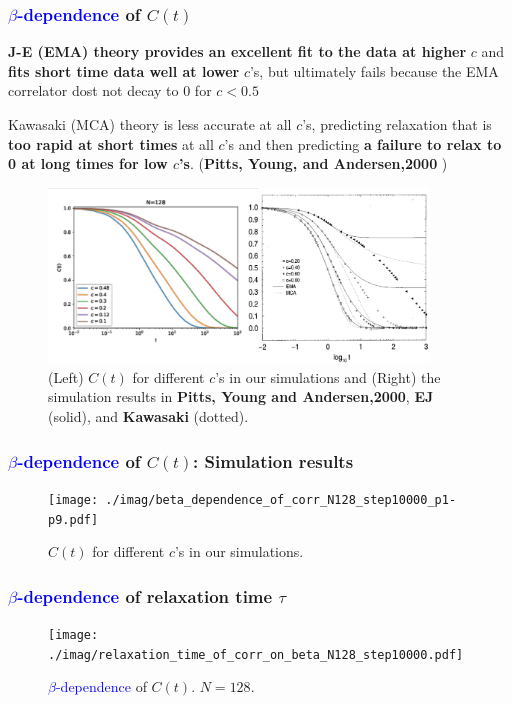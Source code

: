 \documentclass[8pt]{beamer}
\begin{document}
\begin{frame}
	\frametitle{{\textcolor{blue}{$\beta$-dependence}} of $C(t)$}
	\textbf{J-E (EMA) theory provides an excellent fit to the data at higher} $c$ and \textbf{fits short time data well at lower} $c$'s, but ultimately fails because the EMA correlator dost not decay to 0 for $c<0.5$
	
	Kawasaki (MCA) theory is less accurate at all $c$'s, predicting relaxation that is \textbf{too rapid at short times} at all $c$'s and then predicting \textbf{a failure to relax to 0 at long times for low $c$'s}. (\textbf{Pitts, Young, and Andersen,2000} )     
	\begin{figure}
		\centering
		\includegraphics [width=0.9\textwidth] {./imag/beta_dependence_of_corr_N128_step10000_b.pdf}
		\setlength{\abovecaptionskip}{0pt}
		\caption{ (Left) $C(t)$ for different $c$'s in our simulations and (Right) the simulation results in \textbf{Pitts, Young and Andersen,2000}, \textbf{EJ} (solid), and \textbf{Kawasaki} (dotted). }
	\end{figure}
\end{frame}
\begin{frame}
	\frametitle{{\textcolor{blue}{$\beta$-dependence}} of $C(t)$: Simulation results}    
	\begin{figure}
		\centering
		\texttt{[image: ./imag/beta\_dependence\_of\_corr\_N128\_step10000\_p1-p9.pdf]}
		\setlength{\abovecaptionskip}{0pt}
		\caption{ $C(t)$ for different $c$'s in our simulations.}
	\end{figure}
\end{frame}




\begin{frame}
	\frametitle{{\textcolor{blue}{$\beta$-dependence}} of relaxation time $\tau$}
	\begin{figure}
		\centering
		\texttt{[image: ./imag/relaxation\_time\_of\_corr\_on\_beta\_N128\_step10000.pdf]}
		\setlength{\abovecaptionskip}{0pt}
		\caption{{\textcolor{blue}{$\beta$-dependence}} of $C(t)$. $N=128$.}
	\end{figure}
\end{frame}
\end{document}
